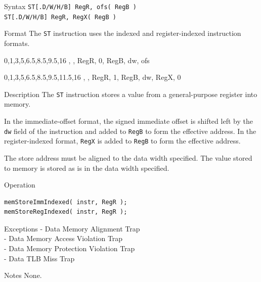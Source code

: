 %
%
\pagebreak
{}

\begin{iPageDescEntry}{Syntax}
    \texttt{ST[.D/W/H/B] RegR, ofs( RegB )} \\
    \texttt{ST[.D/W/H/B] RegR, RegX( RegB )}
\end{iPageDescEntry}

\begin{iPageDescEntry}{Format}
    The \texttt{ST} instruction uses the indexed and register-indexed instruction formats. \\

    \begin{flushleft}
    \drawInstrFormat
        {0,1,3,5,6.5,8.5,9.5,16}
        {\OpCodeGrpMEM, \OpCodeST, RegR, 0, RegB, dw, ofs}
    \end{flushleft}

    \begin{flushleft}
    \drawInstrFormat
        {0,1,3,5,6.5,8.5,9.5,11.5,16}
        {\OpCodeGrpMEM, \OpCodeST, RegR, 1, RegB, dw, RegX, 0}
    \end{flushleft}
\end{iPageDescEntry}

\begin{iPageDescEntry}{Description}
    The \texttt{ST} instruction stores a value from a general-purpose register into memory. 
    
    In the immediate-offset format, the signed immediate offset is shifted left by the \texttt{dw} field of the instruction and added to \texttt{RegB} to form the effective address. In the register-indexed format, \texttt{RegX} is added to \texttt{RegB} to form the effective address.
    
    The store address must be aligned to the data width specified. The value stored to memory is stored  as is in the data width specified.
\end{iPageDescEntry}

\begin{iPageDescOpEntry}{Operation}
\begin{lstlisting}[style=iPageOpStyle]
memStoreImmIndexed( instr, RegR );
memStoreRegIndexed( instr, RegR );
\end{lstlisting}
\end{iPageDescOpEntry}

\begin{iPageDescEntry}{Exceptions}
    - Data Memory Alignment Trap \\
    - Data Memory Access Violation Trap \\
    - Data Memory Protection Violation Trap \\
    - Data TLB Miss Trap
\end{iPageDescEntry}

\begin{iPageDescEntry}{Notes}
   None.
\end{iPageDescEntry}


